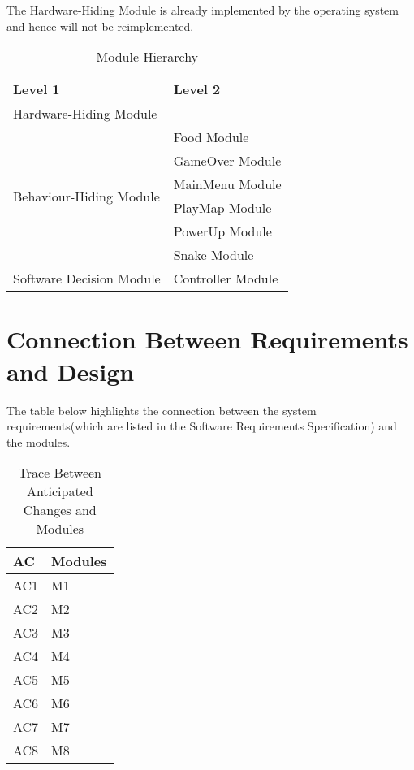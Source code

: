 \documentclass[12pt]{article}
\begin{document}
The Hardware-Hiding Module is already implemented by the operating system and hence will not be reimplemented.

\begin{table}[h!]
\centering
\begin{tabular}{p{} p{}}
\toprule
\textbf{Level 1} & \textbf{Level 2}\\
\midrule

{Hardware-Hiding Module} & ~ \\
\midrule

\multirow{6}{0.3\textwidth}{Behaviour-Hiding Module} 
& Food Module\\
& GameOver Module\\
& MainMenu Module\\
& PlayMap Module\\
& PowerUp Module\\ 
& Snake Module\\
\midrule

\multirow{3}{0.3\textwidth}{Software Decision Module} 
& Controller Module\\
\bottomrule

\end{tabular}
\caption{Module Hierarchy}
\label{TblMH}
\end{table}

\section{Connection Between Requirements and Design} \label{SecConnection}

The table below highlights the connection between the system requirements(which are listed in the Software Requirements Specification) and the modules.

\begin{table}[H]
\centering
\begin{tabular}{p{} p{}}
\toprule
\textbf{AC} & \textbf{Modules}\\
\midrule
AC1 & M1\\
AC2 & M2\\
AC3 & M3\\
AC4 & M4\\
AC5 & M5\\
AC6 & M6\\
AC7 & M7\\
AC8 & M8\\
\bottomrule
\end{tabular}
\caption{Trace Between Anticipated Changes and Modules}
\end{table}
\end{document}
